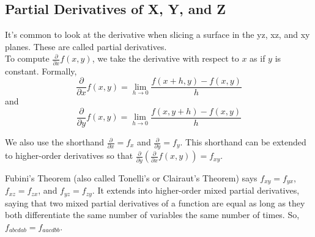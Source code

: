 \subsection{Partial Derivatives of X, Y, and Z}
\noindent
It's common to look at the derivative when slicing a surface in the yz, xz, and xy planes. These are called partial derivatives.\\

\noindent
To compute $\frac{\partial}{\partial x}{f(x,y)}$, we take the derivative with respect to $x$ as if $y$ is constant. Formally,
$$\frac{\partial}{\partial x}f(x,y)=\lim_{h\to 0}{\frac{f(x+h,y)-f(x,y)}{h}}$$ and $$\frac{\partial}{\partial y}f(x,y)=\lim_{h\to 0}{\frac{f(x,y+h)-f(x,y)}{h}}$$

\noindent
We also use the shorthand $\frac{\partial}{\partial x}=f_x$ and $\frac{\partial}{\partial y}=f_y$. This shorthand can be extended to higher-order derivatives so that $\frac{\partial}{\partial y}\left(\frac{\partial}{\partial x}f(x,y)\right)=f_{xy}$.

\noindent
Fubini's Theorem (also called Tonelli's or Clairaut's Theorem) says $f_{xy}=f_{yx}$, $f_{xz}=f_{zx}$, and $f_{yz}=f_{zy}$. It extends into higher-order mixed partial derivatives, saying that two mixed partial derivatives of a function are equal as long as they both differentiate the same number of variables the same number of times. So, $f_{abcdab}=f_{aacdbb}$.